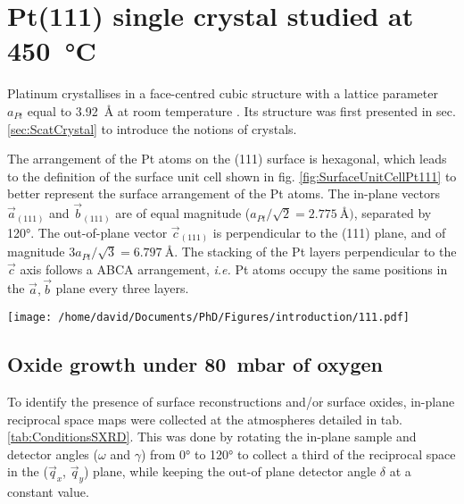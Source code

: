 \section{Pt(111) single crystal studied at \qty{450}{\degreeCelsius}} \label{sec:SXRD111}

Platinum crystallises in a face-centred cubic structure with a lattice parameter $a_{Pt}$ equal to \qty{3.92}{\angstrom} at room temperature \parencite{Waseda1975}.
Its structure was first presented in sec. \ref{sec:ScatCrystal} to introduce the notions of crystals.

The arrangement of the Pt atoms on the (111) surface is hexagonal, which leads to the definition of the surface unit cell shown in fig. \ref{fig:SurfaceUnitCellPt111} to better represent the surface arrangement of the Pt atoms.
The in-plane vectors $\vec{a}_{(111)}$ and $\vec{b}_{(111)}$ are of equal magnitude ($a_{Pt} / \sqrt{2} = \qty{2.775}{\angstrom})$, separated by \ang{120}.
The out-of-plane vector $\vec{c}_{(111)}$ is perpendicular to the (111) plane, and of magnitude $3 a_{Pt} / \sqrt{3} = \qty{6.797}{\angstrom}$.
The stacking of the Pt layers perpendicular to the $\vec{c}$ axis follows a ABCA arrangement, \textit{i.e.} Pt atoms occupy the same positions in the $\vec{a}, \vec{b}$ plane every three layers.

\begin{SCfigure}
    \centering
    \texttt{[image: /home/david/Documents/PhD/Figures/introduction/111.pdf]}
    \caption{
        Face-centred cubic unit cell of Pt with (111) crystallographic plane drawn in green.
        $\vec{a}_{(111)}$, $\vec{b}_{(111)}$ and $\vec{c}_{(111)}$ are the $(111)$ surface unit cell vectors.
        There are three \{111\} planes spanned by the magnitude of $\vec{c}_{(111)}$ (blue, red and green on the figure).
    }
    \label{fig:SurfaceUnitCellPt111}
\end{SCfigure}

\subsection{Oxide growth under \qty{80}{\milli\bar} of oxygen}

To identify the presence of surface reconstructions and/or surface oxides, in-plane reciprocal space maps were collected at the atmospheres detailed in tab. \ref{tab:ConditionsSXRD}.
This was done by rotating the in-plane sample and detector angles ($\omega$ and $\gamma$) from \ang{0} to \ang{120} to collect a third of the reciprocal space in the ($\vec{q}_x$, $\vec{q}_y$) plane, while keeping the out-of plane detector angle $\delta$ at a constant value.

